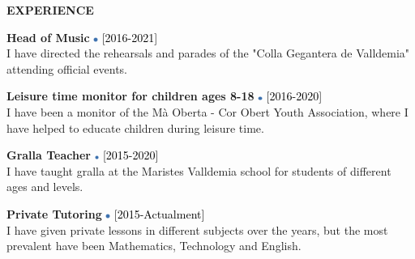 \documentclass[../main.tex]{subfiles}
\begin{document}
    \vspace*{0.5cm}
    \textbf{\textcolor{myCV2}{EXPERIENCE\underline{\hspace{7.1cm}}}}
        \vspace*{0.3cm}
        
        \textbf{Head of Music}
        \includegraphics[width=0.15cm]{assets/full.png} 
        \textcolor{black}{[2016-2021]}\\
        I have directed the rehearsals and parades of the "Colla Gegantera de Valldemia" attending official events.
        
        \vspace*{0.25cm}
        \textbf{Leisure time monitor for children ages 8-18}
        \includegraphics[width=0.15cm]{assets/full.png}
        \textcolor{black}{[2016-2020]}\\
        I have been a monitor of the Mà Oberta - Cor Obert Youth Association, where I have helped to educate children during leisure time.
        
        \vspace*{0.25cm}
        \textbf{Gralla Teacher}
        \includegraphics[width=0.15cm]{assets/full.png}
        \textcolor{black}{[2015-2020]} \\
        I have taught gralla at the Maristes Valldemia school for students of different ages and levels.
        
        \vspace*{0.25cm}
        \textbf{Private Tutoring}
        \includegraphics[width=0.15cm]{assets/full.png}
        \textcolor{black}{[2015-Actualment]} \\
        I have given private lessons in different subjects over the years, but the most prevalent have been Mathematics, Technology and English.
\end{document}
